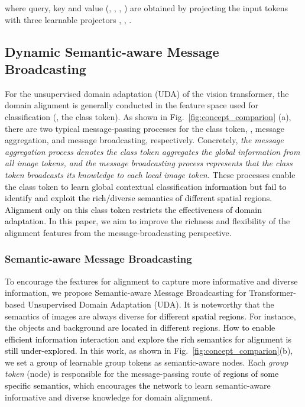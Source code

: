 \documentclass[journal]{IEEEtran}
\newcommand{\tcb}{\textcolor{black}}
\begin{document}
where query, key and value (\ieno, , , ) are obtained by projecting the input tokens  with three learnable projectors , , .

\subsection{Dynamic Semantic-aware Message Broadcasting}
For the unsupervised domain adaptation (UDA) of the vision transformer, the domain alignment is generally conducted in the feature space used for classification (\ieno, the class token). As shown in Fig.~\ref{fig:concept_comparion} (a), there are two typical message-passing processes for the class token, \ieno, message aggregation, and message broadcasting, respectively. Concretely, \textit{the message aggregation process denotes the class token aggregates the global information from all image tokens, and the message broadcasting process represents that the class token broadcasts its knowledge to each local image token.} 
These processes enable the class token to learn global contextual classification \tcb{information but fail to identify and exploit the rich/diverse semantics of different spatial regions. Alignment only on this class token restricts the effectiveness of domain adaptation.} 
In this paper, we aim to improve the richness and flexibility of the alignment features from the message-broadcasting perspective. 

\subsubsection{Semantic-aware Message Broadcasting} 
\label{sec:samb}
To encourage the features for alignment to capture more informative and diverse information, we propose Semantic-aware Message Broadcasting for Transformer-based Unsupervised Domain Adaptation (UDA). It is noteworthy that the semantics of images are always diverse \tcb{for different spatial regions}.
For instance, the objects and background are \tcb{located} in different regions. \tcb{How to enable efficient information interaction and explore the rich semantics for alignment is still under-explored.}  
In this work, as shown in Fig.~\ref{fig:concept_comparion}(b), we set a group of learnable group tokens  as semantic-aware nodes. Each \emph{group token} (node) is responsible for the message-passing route of \tcb{regions of some specific semantics},
which encourages \tcb{the network} to learn semantic-aware informative and diverse knowledge for domain alignment. 
\end{document}
